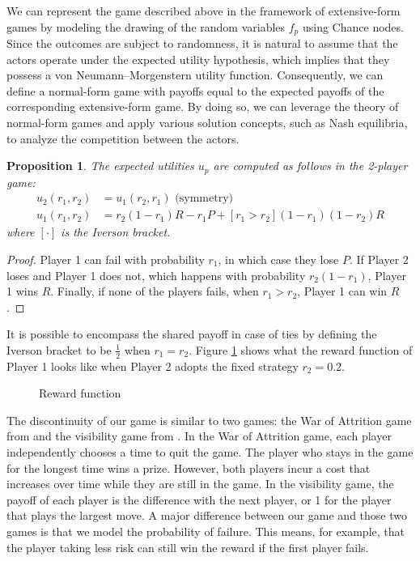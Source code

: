 \documentclass[preprint,12pt,authoryear]{elsarticle}
\newtheorem{proposition}[theorem]{Proposition}
\theoremstyle{definition}
\begin{document}
We can represent the game described above in the framework of extensive-form games by modeling the drawing of the random variables $f_p$ using Chance nodes. Since the outcomes are subject to randomness, it is natural to assume that the actors operate under the expected utility hypothesis, which implies that they possess a von Neumann–Morgenstern utility function. Consequently, we can define a normal-form game with payoffs equal to the expected payoffs of the corresponding extensive-form game. By doing so, we can leverage the theory of normal-form games and apply various solution concepts, such as Nash equilibria, to analyze the competition between the actors.
\begin{proposition}
The expected utilities $u_p$ are computed as follows in the 2-player game:
\begin{align*}
    u_2(r_1, r_2) &= u_1(r_2, r_1) \text{~(symmetry)}\\
    u_1(r_1, r_2) &= r_2 (1-r_1) R - r_1 P + [ r_1 > r_2 ] (1-r_1)(1-r_2) R
\end{align*}
where $[ \cdot ]$ is the Iverson bracket.
\end{proposition}
\begin{proof}
Player 1 can fail with probability $r_1$, in which case they lose $P$. If Player 2 loses and Player 1 does not, which happens with probability $r_2(1-r_1)$, Player 1 wins $R$. Finally, if none of the players fails, when $r_1 > r_2$, Player 1 can win $R$.
\end{proof}

It is possible to encompass the shared payoff in case of ties by defining the Iverson bracket to be $\frac{1}{2}$ when $r_1 = r_2$.
Figure \ref{fig:reward} shows what the reward function of Player 1 looks like when Player 2 adopts the fixed strategy $r_2=0.2$.

\begin{figure}[htbp]
    \centering
    
    \caption{Reward function}
    \label{fig:reward}
\end{figure}


The discontinuity of our game is similar to two games: the War of Attrition game from \cite{smith1974theory} and the visibility game from \cite{Lotker2008-tx}. In the War of Attrition game, each player independently chooses a time to quit the game. The player who stays in the game for the longest time wins a prize. However, both players incur a cost that increases over time while they are still in the game. In the visibility game, the payoff of each player is the difference with the next player, or 1 for the player that plays the largest move. A major difference between our game and those two games is that we model the probability of failure. This means, for example, that the player taking less risk can still win the reward if the first player fails.
\end{document}
